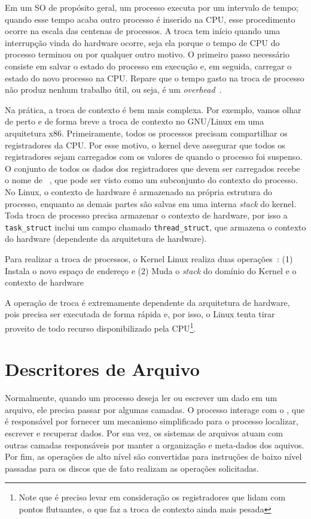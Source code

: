 Em um SO de propósito geral, um processo executa por um intervalo de tempo;
quando esse tempo acaba outro processo é inserido na CPU, esse procedimento
ocorre na escala das centenas de processos. A troca tem início quando uma
interrupção vinda do hardware ocorre, seja ela porque o tempo de CPU do
processo terminou ou por qualquer outro motivo. O primeiro passo necessário
consiste em salvar o estado do processo em execução e, em seguida, carregar o
estado do novo processo na CPU. Repare que o tempo gasto na troca de processo
não produz nenhum trabalho útil, ou seja, é um
\textit{overhead}~\citep{silberschatz}.

Na prática, a troca de contexto é bem mais complexa. Por exemplo, vamos olhar
de perto e de forma breve a troca de contexto no GNU/Linux em uma arquitetura
x86.  Primeiramente, todos os processos precisam compartilhar os registradores
da CPU. Por esse motivo, o kernel deve assegurar que todos os registradores
sejam carregados com os valores de quando o processo foi suspenso. O conjunto
de todos os dados dos registradores que devem ser carregados recebe o nome de
~\citep{entendendo_kernel}, que pode ser
visto como um subconjunto do contexto do processo. No Linux, o contexto de
hardware é armazenado na própria estrutura do processo, enquanto as demais
partes são salvas em uma interna \emph{stack} do kernel. Toda troca de processo
precisa armazenar o contexto de hardware, por isso a \texttt{task\_struct}
inclui um campo chamado \texttt{thread\_struct}, que armazena o contexto do
hardware (dependente da arquitetura de hardware).

Para realizar a troca de processos, o Kernel Linux realiza duas
operações~\citep{entendendo_kernel}: (1) Instala o novo espaço de endereço e
(2) Muda o \emph{stack} do domínio do Kernel e o contexto de hardware

A operação de troca é extremamente dependente da arquitetura de hardware, pois
precisa ser executada de forma rápida e, por isso, o Linux tenta tirar proveito
de todo recurso disponibilizado pela CPU\footnote{Note que é preciso levar em
consideração os registradores que lidam com pontos flutuantes, o que faz a troca
de contexto ainda mais pesada}.

\section{Descritores de Arquivo}

Normalmente, quando um processo deseja ler ou escrever um dado em um arquivo,
ele precisa passar por algumas camadas. O processo interage com o
, que é responsável por fornecer um mecanismo
simplificado para o processo localizar, escrever e recuperar dados. Por sua
vez, os sistemas de arquivos atuam com outras camadas responsáveis por manter a
organização e meta-dados dos aquivos. Por fim, as operações de alto nível são
convertidas para instruções de baixo nível passadas para os discos que de fato
realizam as operações solicitadas.

